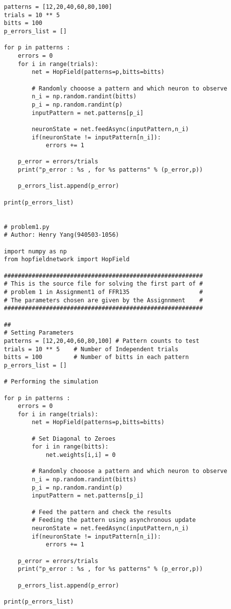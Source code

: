 \documentclass{article}
\begin{document}
\begin{verbatim}
patterns = [12,20,40,60,80,100]
trials = 10 ** 5
bitts = 100
p_errors_list = []

for p in patterns :
    errors = 0
    for i in range(trials):
        net = HopField(patterns=p,bitts=bitts)
          
        # Randomly chooose a pattern and which neuron to observe
        n_i = np.random.randint(bitts)
        p_i = np.random.randint(p)
        inputPattern = net.patterns[p_i]
        
        neuronState = net.feedAsync(inputPattern,n_i)
        if(neuronState != inputPattern[n_i]):
            errors += 1
    
    p_error = errors/trials
    print("p_error : %s , for %s patterns" % (p_error,p))

    p_errors_list.append(p_error)

print(p_errors_list)

        
# problem1.py
# Author: Henry Yang(940503-1056)

import numpy as np
from hopfieldnetwork import HopField

#########################################################
# This is the source file for solving the first part of #
# problem 1 in Assignment1 of FFR135                    #
# The parameters chosen are given by the Assignnment    #
#########################################################

##
# Setting Parameters
patterns = [12,20,40,60,80,100] # Pattern counts to test
trials = 10 ** 5    # Number of Independent trials
bitts = 100         # Number of bitts in each pattern
p_errors_list = []

# Performing the simulation

for p in patterns :
    errors = 0
    for i in range(trials):
        net = HopField(patterns=p,bitts=bitts)

        # Set Diagonal to Zeroes
        for i in range(bitts):
            net.weights[i,i] = 0

        # Randomly chooose a pattern and which neuron to observe
        n_i = np.random.randint(bitts)
        p_i = np.random.randint(p)
        inputPattern = net.patterns[p_i]
        
        # Feed the pattern and check the results
        # Feeding the pattern using asynchronous update
        neuronState = net.feedAsync(inputPattern,n_i)
        if(neuronState != inputPattern[n_i]):
            errors += 1
    
    p_error = errors/trials
    print("p_error : %s , for %s patterns" % (p_error,p))

    p_errors_list.append(p_error)

print(p_errors_list)
\end{verbatim}
\end{document}
